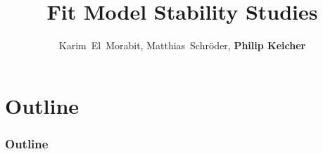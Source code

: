 \documentclass[18pt]{beamer}
\title[\ttbarH Analysis Study]{\ttbarH Fit Model Stability Studies}
\author[Philip Keicher]{Karim~El~Morabit, Matthias~Schröder, \textbf{Philip Keicher}}
\institute{Institut für Experimentelle Kernphysik (IEKP)}
\begin{document}


\begin{frame}
\titlepage
\end{frame}
\setcounter{tocdepth}{2}
\section*{Outline}
\begin{frame}[label={outline}]
	\frametitle{Outline}
	\tableofcontents
\end{frame}









\beginbackup




\backupend
\end{document}
